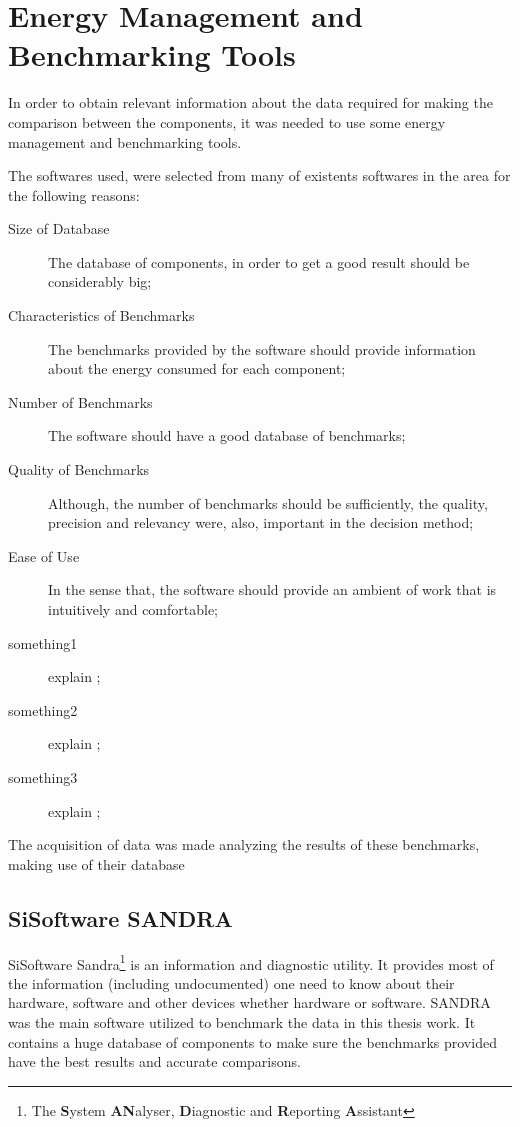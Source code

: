 \section{Energy Management and Benchmarking Tools} \label{sec3:energy_management_tools}
    In order to obtain relevant information about the data required for making the comparison between the components, it was needed to use some energy management and benchmarking tools. 
    
    The softwares used, were selected from many of existents softwares in the area for the following reasons:
\begin{description}
	\item[Size of Database] The database of components, in order to get a good result should be considerably big;
	\item[Characteristics of Benchmarks] The benchmarks provided by the software should provide information about the energy consumed for each component;
	\item[Number of Benchmarks] The software should have a good database of benchmarks;
	\item[Quality of Benchmarks] Although, the number of benchmarks should be sufficiently, the quality, precision and relevancy were, also, important in the decision method;
	\item[Ease of Use] In the sense that, the software should provide an ambient of work that is intuitively and comfortable;
	\item[something1] explain ;%
	\item[something2] explain ;%
	\item[something3] explain ;%
\end{description}
    
    The acquisition of data was made analyzing the results of these benchmarks, making use of their database

\subsection{SiSoftware SANDRA} \label{sec3:sandra}

    SiSoftware Sandra\footnote{The \textbf{S}ystem \textbf{AN}alyser, \textbf{D}iagnostic and \textbf{R}eporting \textbf{A}ssistant} is an information and diagnostic utility. It provides most of the information (including undocumented) one need to know about their hardware, software and other devices whether hardware or software.
SANDRA was the main software utilized to benchmark the data in this thesis work. It contains a huge database of components to make sure the benchmarks provided have the best results and accurate comparisons.
    
